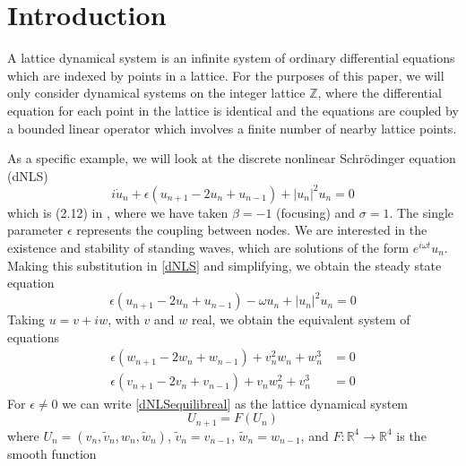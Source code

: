 \documentclass[12pt]{article}
\def\R{{\mathbb R}}
\def\Z{{\mathbb Z}}
\begin{document}
\section{Introduction}

A lattice dynamical system is an infinite system of ordinary differential equations which are indexed by points in a lattice. For the purposes of this paper, we will only consider dynamical systems on the integer lattice $\Z$, where the differential equation for each point in the lattice is identical and the equations are coupled by a bounded linear operator which involves a finite number of nearby lattice points.

As a specific example, we will look at the discrete nonlinear Schr{\"o}dinger equation (dNLS)
\begin{equation}\label{dNLS}
i\dot{u}_n + \epsilon(u_{n+1} - 2 u_n + u_{n-1}) + |u_n|^2 u_n = 0
\end{equation}
which is (2.12) in \cite{Kevrekidis2009}, where we have taken $\beta = -1$ (focusing) and $\sigma = 1$. The single parameter $\epsilon$ represents the coupling between nodes. We are interested in the existence and stability of standing waves, which are solutions of the form $e^{i \omega t}u_n$. Making this substitution in \eqref{dNLS} and simplifying, we obtain the steady state equation
\begin{equation}\label{dNLSequilib}
\epsilon(u_{n+1} - 2 u_n + u_{n-1}) - \omega u_n + |u_n|^2 u_n = 0
\end{equation}
Taking $u = v + i w$, with $v$ and $w$ real, we obtain the equivalent system of equations
\begin{equation}\label{dNLSequilibreal}
\begin{aligned}
\epsilon (w_{n+1} - 2 w_n + w_{n-1}) + v_n^2 w_n + w_n^3 &= 0 \\
\epsilon (v_{n+1} - 2 v_n + v_{n-1}) + v_n w_n^2 + v_n^3 &= 0
\end{aligned}
\end{equation}
For $\epsilon \neq 0$ we can write \eqref{dNLSequilibreal} as the lattice dynamical system
\begin{equation}\label{DNLSlattice1}
U_{n+1} = F(U_n)
\end{equation}
where $U_n = (v_n, \tilde{v}_n, w_n, \tilde{w}_n)$, $\tilde{v}_n = v_{n-1}$, $\tilde{w}_n = w_{n-1}$, and $F:\R^4 \rightarrow \R^4$ is the smooth function
\end{document}
